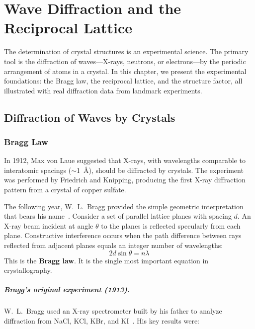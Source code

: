 \chapter{Wave Diffraction and the Reciprocal Lattice}

The determination of crystal structures is an experimental science. The primary tool is the diffraction of waves---X-rays, neutrons, or electrons---by the periodic arrangement of atoms in a crystal. In this chapter, we present the experimental foundations: the Bragg law, the reciprocal lattice, and the structure factor, all illustrated with real diffraction data from landmark experiments.

\section{Diffraction of Waves by Crystals}

\subsection{Bragg Law}

In 1912, Max von Laue suggested that X-rays, with wavelengths comparable to interatomic spacings ($\sim$1~\AA{}), should be diffracted by crystals. The experiment was performed by Friedrich and Knipping, producing the first X-ray diffraction pattern from a crystal of copper sulfate.

The following year, W.~L.~Bragg provided the simple geometric interpretation that bears his name~\cite{bragg1913structure}. Consider a set of parallel lattice planes with spacing $d$. An X-ray beam incident at angle $\theta$ to the planes is reflected specularly from each plane. Constructive interference occurs when the path difference between rays reflected from adjacent planes equals an integer number of wavelengths:
\begin{equation}
\boxed{2d\sin\theta = n\lambda}
\label{eq:bragg}
\end{equation}
This is the \textbf{Bragg law}. It is the single most important equation in crystallography.

\paragraph{Bragg's original experiment (1913).} W.~L.~Bragg used an X-ray spectrometer built by his father to analyze diffraction from NaCl, KCl, KBr, and KI~\cite{bragg1913structure}. His key results were:

